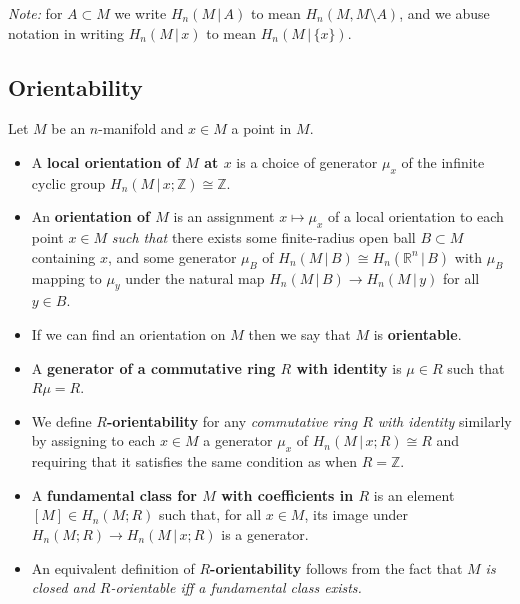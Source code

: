 \documentclass[10pt]{article}
\newcommand{\rr}{\mathbb{R}}
\newcommand{\zz}{\mathbb{Z}}
\newcommand{\vbar}{\,|\,}
\begin{document}
            \emph{Note:} for $A\subset M$ we write $H_n(M\vbar A)$ to mean $H_n(M,M\setminus A)$, and we abuse notation in writing $H_n(M\vbar x)$ to mean $H_n(M\vbar \{x\})$.

        \subsection{Orientability}

            Let $M$ be an $n$-manifold and $x\in M$ a point in $M$.

            \begin{itemize}
                \item A \textbf{local orientation of $M$ at $x$} is a choice of generator $\mu_x$ of the infinite cyclic group $H_n(M\vbar x;\zz)\cong\zz$.
                \item An \textbf{orientation of $M$} is an assignment $x\mapsto\mu_x$ of a local orientation to each point $x\in M$ \emph{such that} there exists some finite-radius open ball $B\subset M$ containing $x$, and some generator $\mu_B$ of $H_n(M\vbar B)\cong H_n(\rr^n\vbar B)$ with $\mu_B$ mapping to $\mu_y$ under the natural map $H_n(M\vbar B)\to H_n(M\vbar y)$ for all $y\in B$.
                \item If we can find an orientation on $M$ then we say that $M$ is \textbf{orientable}.
                \item A \textbf{generator of a commutative ring $R$ with identity} is $\mu\in R$ such that $R\mu=R$.
                \item We define \textbf{$R$-orientability} for any \emph{commutative ring $R$ with identity} similarly by assigning to each $x\in M$ a generator $\mu_x$ of $H_n(M\vbar x;R)\cong R$ and requiring that it satisfies the same condition as when $R=\zz$.
                \item A \textbf{fundamental class for $M$ with coefficients in $R$} is an element $[M]\in H_n(M;R)$ such that, for all $x\in M$, its image under $H_n(M;R)\to H_n(M\vbar x;R)$ is a generator.
                \item An equivalent definition of \textbf{$R$-orientability} follows from the fact that \emph{$M$ is closed and $R$-orientable iff a fundamental class exists.}
            \end{itemize}
\end{document}
